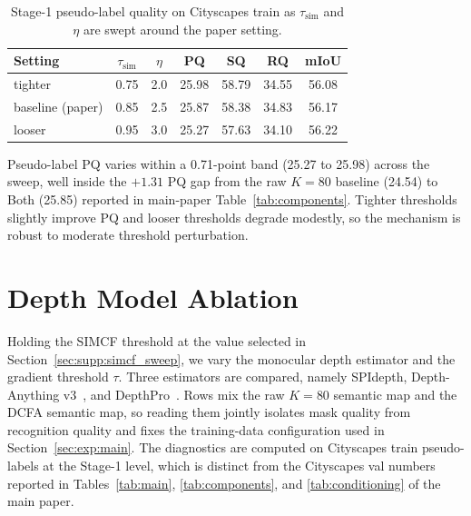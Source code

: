 \documentclass{article}
\begin{document}
\begin{table}[!htbp]
\caption{Stage-1 pseudo-label quality on Cityscapes train as $\tau_\text{sim}$ and $\eta$ are swept around the paper setting.}
\label{tab:simcf_sensitivity}
\centering
\small
\setlength{\tabcolsep}{6pt}
\begin{tabular}{l c c c c c c}
\toprule
Setting & $\tau_\text{sim}$ & $\eta$ & PQ & SQ & RQ & mIoU \\
\midrule
tighter           & 0.75 & 2.0 & 25.98 & 58.79 & 34.55 & 56.08 \\
baseline (paper)  & 0.85 & 2.5 & 25.87 & 58.38 & 34.83 & 56.17 \\
looser            & 0.95 & 3.0 & 25.27 & 57.63 & 34.10 & 56.22 \\
\bottomrule
\end{tabular}
\end{table}

Pseudo-label PQ varies within a 0.71-point band (25.27 to 25.98) across the sweep, well inside the $+1.31$ PQ gap from the raw $K{=}80$ baseline (24.54) to Both (25.85) reported in main-paper Table~\ref{tab:components}. Tighter thresholds slightly improve PQ and looser thresholds degrade modestly, so the mechanism is robust to moderate threshold perturbation.

\section{Depth Model Ablation}
\label{sec:supp:depth}

Holding the SIMCF threshold at the value selected in Section~\ref{sec:supp:simcf_sweep}, we vary the monocular depth estimator and the gradient threshold $\tau$. Three estimators are compared, namely SPIdepth, Depth-Anything v3~\cite{lin2025da3}, and DepthPro~\cite{bochkovskii2024depthpro}. Rows mix the raw $K{=}80$ semantic map and the DCFA semantic map, so reading them jointly isolates mask quality from recognition quality and fixes the training-data configuration used in Section~\ref{sec:exp:main}. The diagnostics are computed on Cityscapes train pseudo-labels at the Stage-1 level, which is distinct from the Cityscapes val numbers reported in Tables~\ref{tab:main}, \ref{tab:components}, and \ref{tab:conditioning} of the main paper.
\end{document}
